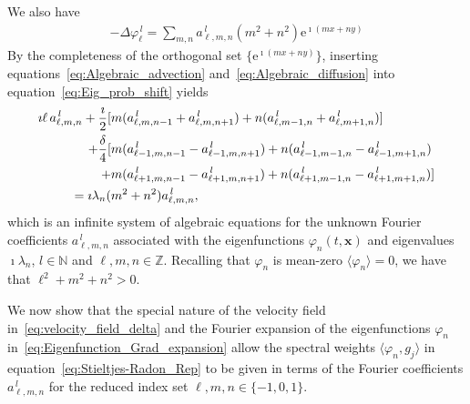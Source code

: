 \documentclass[leqno,onefignum,onetabnum]{siamltex1213}
\newcommand{\e}{\mathrm{e}}
\newcommand{\vecx}{\boldsymbol{x}}
\begin{document}
%
We also have 
%
\begin{align}\label{eq:Algebraic_diffusion}
  -\Delta\varphi_\ell^{\,l}=\sum_{m,n}a^{\,l}_{\ell,m,n}(m^2+n^2)\e^{\imath (mx+ny)}
\end{align}
%
By the completeness of the orthogonal set $\{\e^{\imath (mx+ny)}\}$, 
inserting equations~\eqref{eq:Algebraic_advection}
and~\eqref{eq:Algebraic_diffusion} into
equation~\eqref{eq:Eig_prob_shift} yields 
%
\begin{align}\label{eq:Fourier_Coef_System}
\imath \ell\,a^{\,l}_{\ell,m,n}+\frac{\imath}{2}
[&m(a^{\,l}_{\ell,m,n-1}+a^{\,l}_{\ell,m,n+1})+n(a^{\,l}_{\ell,m-1,n}+a^{\,l}_{\ell,m+1,n})]
\notag\\
+\frac{\delta}{4}[&m(a^{\,l}_{\ell-1,m,n-1}-a^{\,l}_{\ell-1,m,n+1})+n(a^{\,l}_{\ell-1,m-1,n}-a^{\,l}_{\ell-1,m+1,n})
\notag\\
+&m(a^{\,l}_{\ell+1,m,n-1}-a^{\,l}_{\ell+1,m,n+1})+n(a^{\,l}_{\ell+1,m-1,n}-a^{\,l}_{\ell+1,m+1,n})]
\notag\\
=\imath\lambda_n(&m^2+n^2)a^{\,l}_{\ell,m,n},
\end{align}
%
which is an infinite system of algebraic equations for the unknown
Fourier coefficients $a^{\,l}_{\ell,m,n}$ associated with the
eigenfunctions $\varphi_n(t,\vecx)$ and eigenvalues $\imath\lambda_n$,
$l\in\mathbb{N}$ and $\ell,m,n\in\mathbb{Z}$. Recalling that $\varphi_n$ is
mean-zero $\langle\varphi_n\rangle=0$, we have that $\ell^2+m^2+n^2>0$.








We now show that the special nature of the velocity field
in~\eqref{eq:velocity_field_delta} and the Fourier expansion of the
eigenfunctions $\varphi_n$ in~\eqref{eq:Eigenfunction_Grad_expansion} allow
the spectral weights 
$\langle\varphi_n,g_j\rangle$ in equation~\eqref{eq:Stieltjes-Radon_Rep} to be given in
terms of the Fourier coefficients $a^{\,l}_{\ell,m,n}$ for the reduced
index set $\ell,m,n\in\{-1,0,1\}$. 
\end{document}
